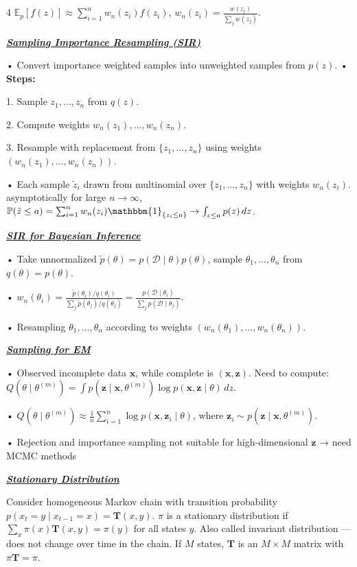 \documentclass[10pt]{article}
\newcommand{\bulletPoint}[1]{\ul{\textit{\textbf{#1}}}}
\begin{document}
\begin{multicols*}{4}
$\mathbb{E}_p[f(z)] \approx \sum_{i=1}^n w_n(z_i)f(z_i)$, $w_n(z_i) = \frac{w(z_i)}{\sum_j w(z_j)}$.

\bulletPoint{Sampling Importance Resampling (SIR)}\quad

• Convert importance weighted samples into unweighted samples from $p(z)$. \quad
• \textbf{Steps:}

1. Sample $z_1,\dots,z_n$ from $q(z)$. 

2. Compute weights $w_n(z_1),\dots,w_n(z_n)$.

3. Resample with replacement from $\{z_1,\dots,z_n\}$ using weights $(w_n(z_1),\dots,w_n(z_n))$. 

• Each sample $\tilde{z}_i$ drawn from multinomial over $\{z_1,\dots,z_n\}$ with weights $w_n(z_i)$. 
asymptotically for large $n\to\infty$, 
$\mathbb{P}(\tilde{z} \leq a) = \sum_{i=1}^n w_n(z_i)\mathbbm{1}_{\{z_i \leq a\}} \to \int_{z \leq a} p(z)\,dz$. 

\bulletPoint{SIR for Bayesian Inference}\quad

• Take unnormalized $\tilde{p}(\theta) = p(\mathcal{D} \mid \theta)p(\theta)$, sample $\theta_1,\dots,\theta_n$ from $q(\theta) = p(\theta)$. 

• $w_n(\theta_i) = \frac{\tilde{p}(\theta_i)/q(\theta_i)}{\sum_j \tilde{p}(\theta_j)/q(\theta_j)} = \frac{p(\mathcal{D} \mid \theta_i)}{\sum_j p(\mathcal{D} \mid \theta_j)}$. 

• Resampling $\theta_1,\dots,\theta_n$ according to weights $(w_n(\theta_1),\dots,w_n(\theta_n))$. 

\bulletPoint{Sampling for EM}\quad

• Observed incomplete data $\mathbf{x}$, while complete is $\mathbf{(x,z)}$. 
Need to compute:
$Q(\theta \mid \theta^{(m)}) = \int p(\mathbf{z} \mid \mathbf{x}, \theta^{(m)}) \log p(\mathbf{x}, \mathbf{z} \mid \theta)\,dz$. 

• $Q(\theta \mid \theta^{(m)}) \approx \frac{1}{n} \sum_{i=1}^n \log p(\mathbf{x}, \mathbf{z}_i \mid \theta)$, where $\mathbf{z}_i \sim p(\mathbf{z} \mid \mathbf{x}, \theta^{(m)})$. 

• Rejection and importance sampling not suitable for high-dimensional $\mathbf{z}$ → need MCMC methods

\bulletPoint{Stationary Distribution}\quad

Consider homogeneous Markov chain with transition probability $p(x_t = y \mid x_{t-1} = x) = \mathbf{T}(x, y)$. 
$\pi$ is a stationary distribution if $\sum_x \pi(x)\mathbf{T}(x, y) = \pi(y)$ for all states $y$. 
Also called invariant distribution — does not change over time in the chain. 
If $M$ states, $\mathbf{T}$ is an $M \times M$ matrix with $\pi \mathbf{T} = \pi$. 


\end{multicols*}
\end{document}

